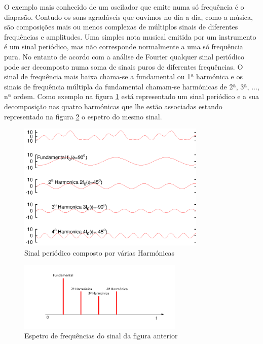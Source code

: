 \documentclass[a4paper,12pt]{article}      %
\begin{document}
O exemplo mais conhecido de um oscilador que emite numa só  frequência é o diapasão. 
Contudo os sons agradáveis que ouvimos no dia a dia, como a música, são composições mais ou menos complexas de múltiplos sinais de diferentes frequências e amplitudes. Uma simples nota musical emitida por um instrumento é um sinal periódico, mas não corresponde normalmente a uma só frequência pura. No entanto de acordo com a análise de Fourier qualquer sinal periódico pode ser decomposto numa soma de sinais puros de diferentes frequências. O sinal de frequência mais baixa chama-se a fundamental ou 1ª harmónica e os sinais de frequência múltipla da fundamental chamam-se harmónicas de 2ª, 3ª, ..., nª ordem. Como exemplo na figura \ref{fig:harm} está representado um sinal periódico e a sua decomposição nas quatro harmónicas que lhe estão associadas estando representado na figura \ref{fig:harm_spectrum} o espetro do mesmo sinal.

\begin{figure}
	[tbp] \centering 
	\includegraphics[width=0.8\textwidth]{harm} \caption{Sinal periódico composto por várias Harmónicas\label{fig:harm} } 
\end{figure}

\begin{figure}
	[htbp] \centering 
	\includegraphics[width=0.7\textwidth]{harm_spectrum} \caption{Espetro de frequências do sinal da figura anterior\label{fig:harm_spectrum} } 
\end{figure}
\end{document}
